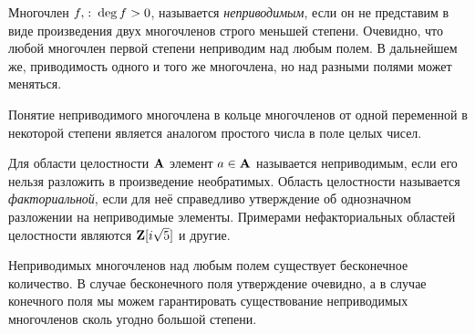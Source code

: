 \begin{df}
  Многочлен $f,\colon\deg f>0$, называется \emph{неприводимым}, если он не представим в виде произведения двух многочленов строго меньшей степени. Очевидно, что любой многочлен первой степени неприводим над любым полем. В дальнейшем же, приводимость одного и того же многочлена, но над разными полями может меняться.
  
  Понятие неприводимого многочлена в кольце многочленов от одной переменной в некоторой степени является аналогом простого числа в поле целых чисел. 
  
  Для области целостности $\mathbf{A}$ элемент $a\in\mathbf{A}$ называется неприводимым, если его нельзя разложить в произведение необратимых. Область целостности называется \emph{факториальной}, если для неё справедливо утверждение об однозначном разложении на неприводимые элементы. Примерами нефакториальных областей целостности являются %
$\mathbf{Z}[i\sqrt{5}]$ и другие.
\end{df}

Неприводимых многочленов над любым полем существует бесконечное количество. В случае бесконечного поля утверждение очевидно, а в случае конечного поля мы можем гарантировать существование неприводимых многочленов сколь угодно большой степени.

